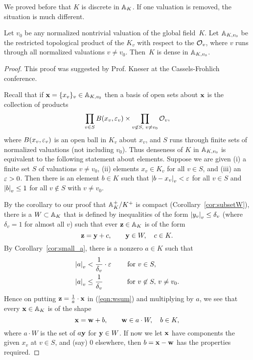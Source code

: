 We proved before that $K$ is discrete in $\AA_K$.  If one valuation is
removed, the situation is much different.
\begin{theorem}\label{thm:strong}
  Let $v_0$ be any normalized nontrivial valuation of the global field~$K$.
  Let $\AA_{K,v_0}$ be the restricted topological product of the
  $K_v$ with respect to the $\O_v$, where $v$ runs through all
  normalized valuations $v\neq v_0$.  Then~$K$ is dense in
  $\AA_{K,v_0}$.
\end{theorem}
\begin{proof}
This proof was suggested by Prof. Kneser at the Cassels-Frohlich
conference.

Recall that if $\bx =\{x_v\}_v\in \AA_{K,v_0}$ then a basis of open
sets about $\bx$ is the collection of products
$$\prod_{v\in S} B(x_v,\eps_v) \times \prod_{v\not\in S,\,\, v\neq v_0} \O_v,$$
where $B(x_v,\eps_v)$ is an open ball in $K_v$ about $x_v$, and
$S$ runs through finite sets of normalized valuations (not including
$v_0$).  Thus
denseness of $K$ in $\AA_{K,v_0}$ is equivalent to the following
statement about elements.  Suppose we are given (i) a finite set $S$
of valuations $v\neq v_0$, (ii) elements $x_v\in K_v$ for all $v\in
S$, and (iii) an $\eps>0$.  Then there is an element $b\in K$ such that
$\abs{b-x_v}_v<\eps$ for all $v\in S$ and $\abs{b}_v\leq 1$ for all
$v\not\in S$ with $v\neq v_0$.

By the corollary to our proof that $\AA_K^+/K^+$ is compact
(Corollary~\ref{cor:subsetW}), there is a $W\subset \AA_K$ that is
defined by inequalities of the form $\abs{y_v}_v\leq \delta_v$ (where
$\delta_v=1$ for almost all $v$) such that ever $\mathbf{z}\in \AA_K$
is of the form
\begin{equation}\label{eqn:wsum}
  \mathbf{z} = \by + c, \qquad \by\in W, \quad c\in K.
\end{equation}
By Corollary~\ref{cor:small_a}, there is a nonzero $a\in K$ such
that
\begin{align*}
  \abs{a}_v &< \frac{1}{\delta_v}\cdot \eps\qquad \text{ for }v\in S,\\
  \abs{a}_v &\leq \frac{1}{\delta_v} \qquad\,\quad \text{ for } v\not\in S,\, v\neq v_0.
\end{align*}
Hence on putting $\mathbf{z} = \frac{1}{a}\cdot \bx$
in (\ref{eqn:wsum}) and multiplying by $a$, we see that
every $\bx\in \AA_K$ is of the shape
$$
  \bx = \mathbf{w} + b,\qquad \mathbf{w}\in a\cdot W, \quad b\in K,
$$
where $a\cdot W$ is the set of $a\by$ for $\by\in W$.
If now we let $\bx$ have components the given $x_v$ at $v\in S$,
and (say) $0$ elsewhere, then $b=\bx-\bw$ has the properties required.
\end{proof}

